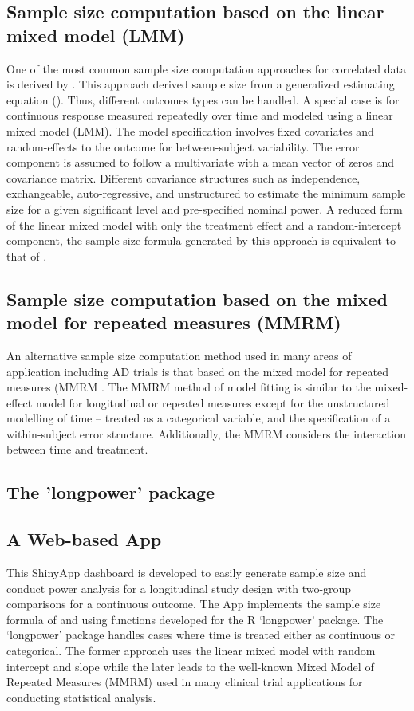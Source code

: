 \documentclass[oupdraft]{bio}
\begin{document}
\subsection{Sample size computation based on the linear mixed model (LMM)}
\label{model}
One of the most common sample size computation approaches for correlated data is derived by \cite{Liu_Liang(1997)}. This approach derived sample size from a generalized estimating equation (\cite{Liang_Zeger(1986)}). Thus, different outcomes types can be handled. A special case is for continuous response measured repeatedly over time and modeled using a linear mixed model (LMM). The model specification involves fixed covariates and random-effects to the outcome for between-subject variability. The error component is assumed to follow a multivariate with a mean vector of zeros and covariance matrix. Different covariance structures such as independence, exchangeable, auto-regressive, and unstructured to estimate the minimum sample size for a given significant level and pre-specified nominal power. A reduced form of the linear mixed model with only the treatment effect and a random-intercept component, the sample size formula generated by this approach is equivalent to that of \cite{Diggle_Liang_Zeger(1994)}. 

\subsection{Sample size computation based on the mixed model for repeated measures (MMRM)}
\label{model2}
An alternative sample size computation method used in many areas of application including AD trials is that based on the mixed model for repeated measures (MMRM \cite{Mallinckrodt_etal(2001),Mallinckrodt_etal(2003),Lane(2008)}. The MMRM method of model fitting is similar to the mixed-effect model for longitudinal or repeated measures except for the unstructured modelling of time – treated as a categorical variable, and the specification of a within-subject error structure. Additionally, the MMRM considers the interaction between time and treatment. 

\subsection{The 'longpower' package}
\label{model3}

\subsection{A Web-based App}
\label{model4}
This ShinyApp dashboard is developed to easily generate sample size and conduct power analysis for a longitudinal study design with two-group comparisons for a continuous outcome. The App implements the sample size formula of \cite{Liu_Liang(1997)} and \cite{Diggle_etal(1994)} using functions developed for the R `longpower' package. The `longpower' package handles cases where time is treated either as continuous or categorical. The former approach uses the linear mixed model with random intercept and slope while the later leads to the well-known Mixed Model of Repeated Measures (MMRM) used in many clinical trial applications for conducting statistical analysis. 
\end{document}

